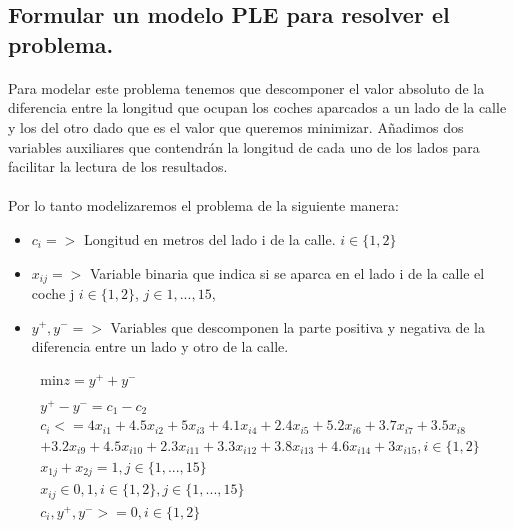 \documentclass[10pt, a4paper]{article}
\begin{document}
		\subsection{Formular un modelo PLE para resolver el problema.}

			\paragraph{}
			Para modelar este problema tenemos que descomponer el valor absoluto de la diferencia entre la longitud que ocupan los coches aparcados a un lado de la calle y los del otro dado que es el valor que queremos minimizar. Añadimos dos variables auxiliares que contendrán la longitud de cada uno de los lados para facilitar la lectura de los resultados.

			\paragraph{}
			Por lo tanto modelizaremos el problema de la siguiente manera:

			\begin{itemize}
				\item \(c_{i} => \) Longitud en metros del lado i de la calle. $i \in \{1,2\}$

				\item \(x_{ij} => \) Variable binaria que indica si se aparca en el lado i de la calle el coche j  $i \in \{1,2\}$, $j \in {1,...,15}$,

				\item \(y^{+}, y^{-} => \) Variables que descomponen la parte positiva y negativa de la diferencia entre un lado y otro de la calle.
			\end{itemize}

			\[
				\begin{split}
					\text{min} z = y^{+} + y^{-} \\ \\
						y^{+} - y^{-} = c_1 - c_2 \\
						c_i <= 4x_{i1} + 4.5x_{i2} + 5x_{i3} + 4.1x_{i4} + 2.4x_{i5} + 5.2x_{i6} + 3.7x_{i7} + 3.5x_{i8} \\
						+ 3.2x_{i9} + 4.5x_{i10} + 2.3x_{i11} + 3.3x_{i12} + 3.8x_{i13} + 4.6x_{i14} + 3x_{i15}, i \in \{1,2\}\\
						x_{1j} + x_{2j} = 1, j \in \{1,...,15\} \\
						x_{ij} \in {0,1}, i \in \{1,2\},j \in \{1,...,15\} \\
						c_{i}, y^{+}, y^{-} >= 0, i \in \{1,2\}\\
				\end{split}
			\]
\end{document}
